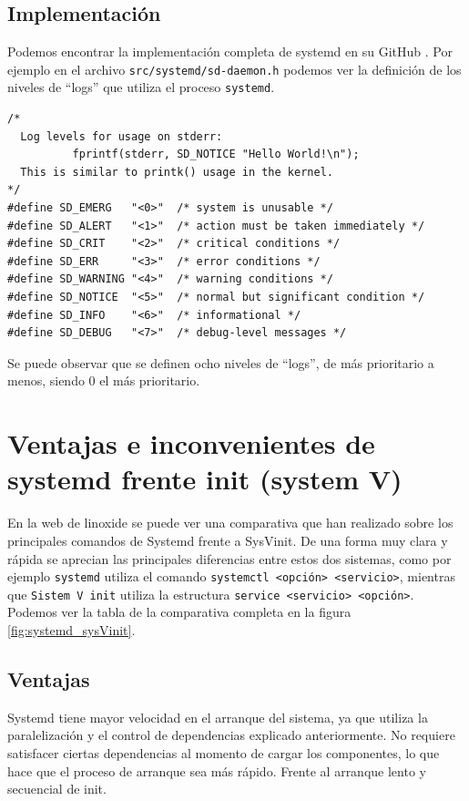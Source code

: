 \subsection{Implementación}

Podemos encontrar la implementación completa de systemd en su GitHub \cite{implementacion_systemd}. Por ejemplo en el archivo \texttt{src/systemd/sd-daemon.h} podemos ver la definición de los niveles de ``logs'' que utiliza el proceso \texttt{systemd}.

\begin{verbatim}
/*
  Log levels for usage on stderr:
          fprintf(stderr, SD_NOTICE "Hello World!\n");
  This is similar to printk() usage in the kernel.
*/
#define SD_EMERG   "<0>"  /* system is unusable */
#define SD_ALERT   "<1>"  /* action must be taken immediately */
#define SD_CRIT    "<2>"  /* critical conditions */
#define SD_ERR     "<3>"  /* error conditions */
#define SD_WARNING "<4>"  /* warning conditions */
#define SD_NOTICE  "<5>"  /* normal but significant condition */
#define SD_INFO    "<6>"  /* informational */
#define SD_DEBUG   "<7>"  /* debug-level messages */
\end{verbatim}

Se puede observar que se definen ocho niveles de ``logs'', de más prioritario a menos, siendo 0 el más prioritario.



\section{Ventajas e inconvenientes de systemd frente init (system V) } 
En la web de linoxide se puede ver una comparativa \cite{systemd_vs_sysvinit} que han realizado sobre los principales comandos de Systemd frente a SysVinit. De una forma muy clara y rápida se aprecian las principales diferencias entre estos dos sistemas, como por ejemplo \texttt{systemd} utiliza el comando \texttt{systemctl <opción> <servicio>}, mientras que \texttt{Sistem V init} utiliza la estructura \texttt{service <servicio> <opción>}. Podemos ver la tabla de la comparativa completa en la figura \ref{fig:systemd_sysVinit}.




\subsection{Ventajas}
Systemd tiene mayor velocidad en el arranque del sistema, ya que utiliza la paralelización y el control de dependencias explicado anteriormente. No requiere satisfacer ciertas dependencias al momento de cargar los componentes, lo que hace que el proceso de arranque sea más rápido. Frente al arranque lento y secuencial de init.\\

